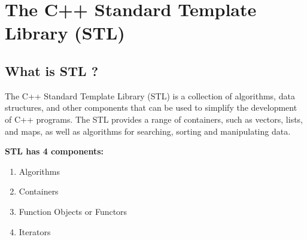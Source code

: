 \newpage
\chapter{The C++ Standard Template Library (STL)}
\section{\textbf{What is STL ?}}

The C++ Standard Template Library (STL) is a collection of algorithms, data structures, and other components that can be used to simplify the development of C++ programs. The STL provides a range of containers, such as vectors, lists, and maps, as well as algorithms for searching, sorting and manipulating data.

\vspace{0.5cm}

\textbf{STL has 4 components:}
\begin{enumerate}
	\item Algorithms
	\item Containers
	\item Function Objects or Functors
	\item Iterators
\end{enumerate}

